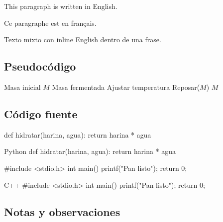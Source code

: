\documentclass[
  coursetitle={Cómputo Nube y Tecnologías Emergentes},
  coursehours={96},
  coursedate={Verano 2026},
  doctype={Guía del curso},
  otherlangs={english,french},
  authorname={Lázaro},
  authorsurname={Bustio-Martínez},
  authortitle={PhD},
  role={Profesor Investigador},
  email={lbustio@inaoe.mx},
  phone={5559504000},
  ext={7459},
  institution={Instituto Nacional de Astrofísica, Óptica y Electrónica (INAOE)},
  department={Maestría en Ciencias en Tecnologías de Seguridad},
  address={Luis Enrique Erro 1, Sta. Ma. Tonantzintla, San Andrés Cholula, CP 72840, Puebla, México},
  margin={0.5in}
]{lbustio_lecture_notes}
\begin{document}
\begin{otherlanguage}{english}
This paragraph is written in English.
\end{otherlanguage}

\begin{otherlanguage}{french}
Ce paragraphe est en fran\c{c}ais.
\end{otherlanguage}

Texto mixto con \foreignlanguage{english}{inline English} dentro de una frase.

\subsection{Pseudocódigo}

\begin{algorithm}
\caption{Proceso de fermentación controlada}
\begin{algorithmic}[1]
\Require Masa inicial $M$
\Ensure Masa fermentada
\State Ajustar temperatura
  \State Reposar($M$) 
\EndFor
\State \Return $M$
\end{algorithmic}
\end{algorithm}

\subsection{Código fuente}

\begin{pythoncode}
def hidratar(harina, agua):
    return harina * agua
\end{pythoncode}

\begin{CodeBox}{Python}
def hidratar(harina, agua):
    return harina * agua
\end{CodeBox}

\begin{cppcode}
#include <stdio.h>
int main() {
  printf("Pan listo\n");
  return 0;
}
\end{cppcode}

\begin{CodeBox}{C++}
#include <stdio.h>
int main() {
  printf("Pan listo\n");
  return 0;
}
\end{CodeBox}

\subsection{Notas y observaciones}




\end{document}
